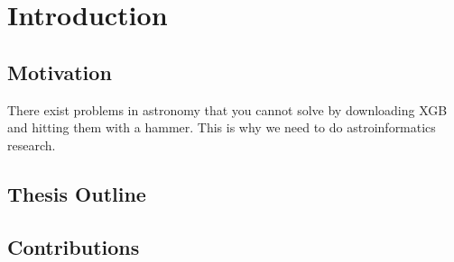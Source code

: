 \chapter{Introduction}
\label{cha:intro}


\section{Motivation}
\label{sec:motivation}

There exist problems in astronomy that you cannot solve by downloading XGB and hitting them with a hammer. This is why we need to do astroinformatics research.


\section{Thesis Outline}
\label{sec:outline}


\section{Contributions}
\label{sec:contributions}

